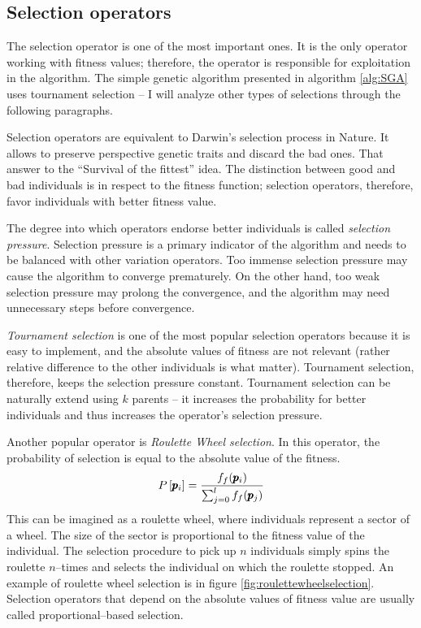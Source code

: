 \subsection{Selection operators}

The selection operator is one of the most important ones. It is the only operator working with fitness values; therefore, the operator is responsible for exploitation in the algorithm. The simple genetic algorithm presented in algorithm \ref{alg:SGA} uses tournament selection -- I will analyze other types of selections through the following paragraphs.

Selection operators are equivalent to Darwin's selection process in Nature. It allows to preserve perspective genetic traits and discard the bad ones. That answer to the \enquote{Survival of the fittest} idea. The distinction between good and bad individuals is in respect to the fitness function; selection operators, therefore, favor individuals with better fitness value.

The degree into which operators endorse better individuals is called \emph{selection pressure}. Selection pressure is a primary indicator of the algorithm and needs to be balanced with other variation operators. Too immense selection pressure may cause the algorithm to converge prematurely. On the other hand, too weak selection pressure may prolong the convergence, and the algorithm may need unnecessary steps before convergence.

\emph{Tournament selection} is one of the most popular selection operators because it is easy to implement, and the absolute values of fitness are not relevant (rather relative difference to the other individuals is what matter). Tournament selection, therefore, keeps the selection pressure constant. Tournament selection can be naturally extend using $k$ parents -- it increases the probability for better individuals and thus increases the operator's selection pressure.

Another popular operator is \emph{Roulette Wheel selection}. In this operator, the probability of selection is equal to the absolute value of the fitness.
$$ P\left[\pmb{p}_i\right] = \frac{f_f(\pmb{p}_i)}{\sum_{j=0}^{l}f_f(\pmb{p}_j)} $$
This can be imagined as a roulette wheel, where individuals represent a sector of a wheel. The size of the sector is proportional to the fitness value of the individual. The selection procedure to pick up $n$ individuals simply spins the roulette $n$--times and selects the individual on which the roulette stopped. An example of roulette wheel selection is in figure \ref{fig:roulettewheelselection}. Selection operators that depend on the absolute values of fitness value are usually called proportional--based selection.

